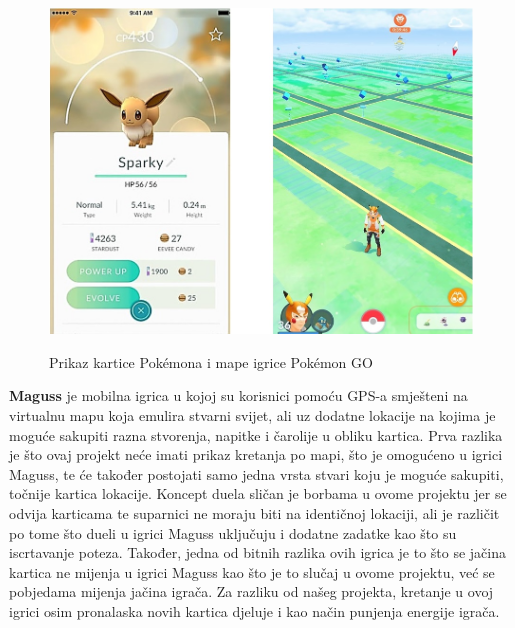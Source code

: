 		\begin{figure}[H]
			\centering
			\includegraphics[scale=0.45]{slike/PokemonGO} \\%
			\caption{Prikaz kartice Pokémona i mape igrice Pokémon GO}
			\label{fig:PokemonGO} %
		\end{figure}
	
		\textnormal{\textbf{Maguss} je mobilna igrica u kojoj su korisnici pomoću GPS-a smješteni na virtualnu mapu koja emulira stvarni svijet, ali uz dodatne lokacije na kojima je moguće sakupiti razna stvorenja, napitke i čarolije u obliku kartica. Prva razlika je što ovaj projekt neće imati prikaz kretanja po mapi, što je omogućeno u igrici Maguss, te će također postojati samo jedna vrsta stvari koju je moguće sakupiti, točnije kartica lokacije. Koncept duela sličan je borbama u ovome projektu jer se odvija karticama te suparnici ne moraju biti na identičnoj lokaciji, ali je različit po tome što dueli u igrici Maguss uključuju i dodatne zadatke kao što su iscrtavanje poteza. Također, jedna od bitnih razlika ovih igrica je to što se jačina kartica ne mijenja u igrici Maguss kao što je to slučaj u ovome projektu, već se pobjedama mijenja jačina igrača. Za razliku od našeg projekta, kretanje u ovoj igrici osim pronalaska novih kartica djeluje i kao način punjenja energije igrača.   }
		
